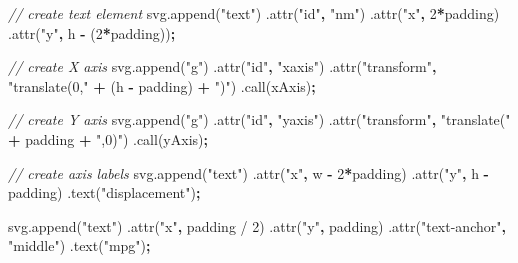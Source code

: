 \documentclass[openany]{book}
\newenvironment{Shaded}{\begin{snugshade}}{\end{snugshade}}
\newcommand{\AttributeTok}[1]{\textcolor[rgb]{0.77,0.63,0.00}{#1}}
\newcommand{\CommentTok}[1]{\textcolor[rgb]{0.56,0.35,0.01}{\textit{#1}}}
\newcommand{\DecValTok}[1]{\textcolor[rgb]{0.00,0.00,0.81}{#1}}
\newcommand{\NormalTok}[1]{#1}
\newcommand{\OperatorTok}[1]{\textcolor[rgb]{0.81,0.36,0.00}{\textbf{#1}}}
\newcommand{\StringTok}[1]{\textcolor[rgb]{0.31,0.60,0.02}{#1}}
\newcommand{\VariableTok}[1]{\textcolor[rgb]{0.00,0.00,0.00}{#1}}
\begin{document}
\begin{Shaded}
\begin{Highlighting}[]
\CommentTok{// create text element}
\VariableTok{svg}\NormalTok{.}\AttributeTok{append}\NormalTok{(}\StringTok{"text"}\NormalTok{)}
\NormalTok{  .}\AttributeTok{attr}\NormalTok{(}\StringTok{"id"}\OperatorTok{,} \StringTok{"nm"}\NormalTok{)}
\NormalTok{  .}\AttributeTok{attr}\NormalTok{(}\StringTok{"x"}\OperatorTok{,} \DecValTok{2}\OperatorTok{*}\NormalTok{padding)}
\NormalTok{  .}\AttributeTok{attr}\NormalTok{(}\StringTok{"y"}\OperatorTok{,}\NormalTok{ h }\OperatorTok{-}\NormalTok{ (}\DecValTok{2}\OperatorTok{*}\NormalTok{padding))}\OperatorTok{;}

\CommentTok{// create X axis}
\VariableTok{svg}\NormalTok{.}\AttributeTok{append}\NormalTok{(}\StringTok{"g"}\NormalTok{)}
\NormalTok{    .}\AttributeTok{attr}\NormalTok{(}\StringTok{"id"}\OperatorTok{,} \StringTok{"xaxis"}\NormalTok{)}
\NormalTok{    .}\AttributeTok{attr}\NormalTok{(}\StringTok{"transform"}\OperatorTok{,} \StringTok{"translate(0,"} \OperatorTok{+}\NormalTok{ (h }\OperatorTok{-}\NormalTok{ padding) }\OperatorTok{+} \StringTok{")"}\NormalTok{)}
\NormalTok{    .}\AttributeTok{call}\NormalTok{(xAxis)}\OperatorTok{;}

\CommentTok{// create Y axis}
\VariableTok{svg}\NormalTok{.}\AttributeTok{append}\NormalTok{(}\StringTok{"g"}\NormalTok{)}
\NormalTok{    .}\AttributeTok{attr}\NormalTok{(}\StringTok{"id"}\OperatorTok{,} \StringTok{"yaxis"}\NormalTok{)}
\NormalTok{    .}\AttributeTok{attr}\NormalTok{(}\StringTok{"transform"}\OperatorTok{,} \StringTok{"translate("} \OperatorTok{+}\NormalTok{ padding }\OperatorTok{+} \StringTok{",0)"}\NormalTok{)}
\NormalTok{    .}\AttributeTok{call}\NormalTok{(yAxis)}\OperatorTok{;}
    
\CommentTok{// create axis labels}
\VariableTok{svg}\NormalTok{.}\AttributeTok{append}\NormalTok{(}\StringTok{"text"}\NormalTok{)}
\NormalTok{  .}\AttributeTok{attr}\NormalTok{(}\StringTok{"x"}\OperatorTok{,}\NormalTok{ w }\OperatorTok{-} \DecValTok{2}\OperatorTok{*}\NormalTok{padding)}
\NormalTok{  .}\AttributeTok{attr}\NormalTok{(}\StringTok{"y"}\OperatorTok{,}\NormalTok{ h }\OperatorTok{-}\NormalTok{ padding)}
\NormalTok{  .}\AttributeTok{text}\NormalTok{(}\StringTok{"displacement"}\NormalTok{)}\OperatorTok{;}
  
\VariableTok{svg}\NormalTok{.}\AttributeTok{append}\NormalTok{(}\StringTok{"text"}\NormalTok{)}
\NormalTok{  .}\AttributeTok{attr}\NormalTok{(}\StringTok{"x"}\OperatorTok{,}\NormalTok{ padding / }\DecValTok{2}\NormalTok{)}
\NormalTok{  .}\AttributeTok{attr}\NormalTok{(}\StringTok{"y"}\OperatorTok{,}\NormalTok{ padding)}
\NormalTok{  .}\AttributeTok{attr}\NormalTok{(}\StringTok{"text-anchor"}\OperatorTok{,} \StringTok{"middle"}\NormalTok{)}
\NormalTok{  .}\AttributeTok{text}\NormalTok{(}\StringTok{"mpg"}\NormalTok{)}\OperatorTok{;}
  

\end{Highlighting}
\end{Shaded}
\end{document}

